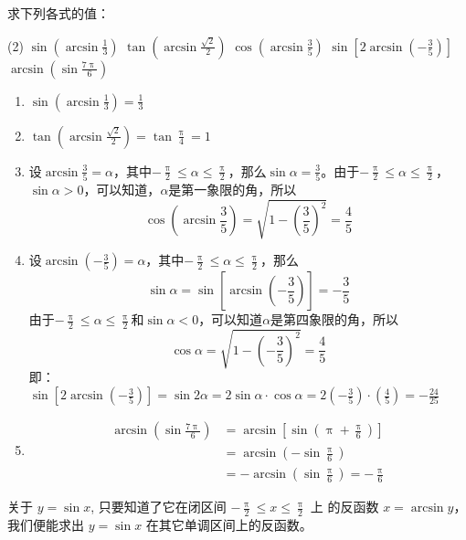 \begin{example}
    求下列各式的值：
\begin{tasks}(2)
  \task $\sin\left(\arcsin\frac{1}{3}\right)$
  \task $\tan\left(\arcsin\frac{\sqrt{2}}{2}\right)$
  \task $\cos\left(\arcsin\frac{3}{5}\right)$
  \task $\sin\left[2\arcsin\left(-\frac{3}{5}\right)\right]$
  \task $\arcsin\left(\sin\frac{7\uppi}{6}\right)$
\end{tasks}
\end{example}

\begin{solution}
\begin{enumerate}
    \item $\sin\left(\arcsin\frac{1}{3}\right)=\frac{1}{3}$
    \item $\tan\left(\arcsin\frac{\sqrt{2}}{2}\right)=\tan\frac{\uppi}{4}=1$
    \item 设$\arcsin\frac{3}{5}=\alpha$，其中$-\frac{\uppi}{2}\le\alpha\le\frac{\uppi}{2}$，那么$\sin\alpha=\frac{3}{5}$。由于$-\frac{\uppi}{2}\le\alpha\le\frac{\uppi}{2}$，$\sin\alpha>0$，可以知道，$\alpha$是第一象限的角，所以
    $$\cos\left(\arcsin\frac{3}{5}\right)=\sqrt{1-\left(\frac{3}{5}\right)^2}=\frac{4}{5}$$
    \item 设$\arcsin\left(-\frac{3}{5}\right)=\alpha$，其中$-\frac{\uppi}{2}\le\alpha\le\frac{\uppi}{2}$，那么
    \[\sin\alpha =\sin\left[\arcsin\left(-\frac{3}{5}\right)\right]=-\frac{3}{5}\]
由于$-\frac{\uppi}{2}\le\alpha\le\frac{\uppi}{2}$和$\sin\alpha<0$，可以知道$\alpha$是第四象限的角，所以
\[\cos\alpha=\sqrt{1-\left(-\frac{3}{5}\right)^2}=\frac{4}{5}\]
即：
$\sin\left[2\arcsin\left(-\frac{3}{5}\right)\right]=\sin2\alpha=2\sin\alpha\cdot \cos\alpha=2\left(-\frac{3}{5}\right)\cdot\left(\frac{4}{5}\right)=-\frac{24}{25}$
    \item \[\begin{split}
\arcsin\left(\sin\frac{7\uppi}{6}\right)&=\arcsin\left[\sin\left(\uppi+\frac{\uppi}{6}\right)\right]\\
&=\arcsin\left(-\sin\frac{\uppi}{6}\right)\\
&=-\arcsin\left(\sin\frac{\uppi}{6}\right)=-\frac{\uppi}{6}        
    \end{split}\]
\end{enumerate}
\end{solution}

关于 $y=\sin x$, 只要知道了它在闭区间 $-\frac{\uppi}{2}\leqslant x\leqslant \frac{\uppi}{2}$ 上
的反函数 $x=\arcsin y$，我们便能求出 $y=\sin x$ 在其它单调区间上的反函数。

